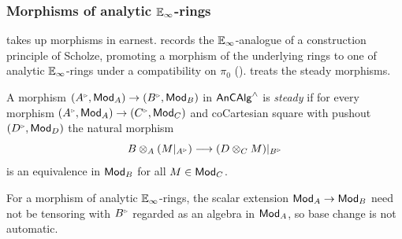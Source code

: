 \subsubsection{Morphisms of analytic \texorpdfstring{$\mathbb{E}_{\infty}$}{E-infinity}-rings}\label{subsubsec: intro morphisms}
 takes up morphisms in earnest.  records the $\mathbb{E}_{\infty}$-analogue of a construction principle of Scholze, promoting a morphism of the underlying rings to one of analytic $\mathbb{E}_{\infty}$-rings under a compatibility on $\pi_{0}$ ().  treats the steady morphisms.
\begin{definition*}[\ref{def: steady morphism}]
    A morphism $(A^{\tri},\Mod_{A})\to(B^{\tri},\Mod_{B})$ in $\mathsf{An}\mathsf{CAlg}^{\wedge}$ is \emph{steady} if for every morphism $(A^{\tri},\Mod_{A})\to(C^{\tri},\Mod_{C})$ and coCartesian square with pushout $(D^{\tri},\Mod_{D})$ the natural morphism
    $$B\otimes_{A}(M|_{A^{\tri}})\longrightarrow(D\otimes_{C}M)|_{B^{\tri}}$$
    is an equivalence in $\mathsf{Mod}_{B}$ for all $M\in\mathsf{Mod}_{C}$.
\end{definition*}
For a morphism of analytic $\mathbb{E}_{\infty}$-rings, the scalar extension $\mathsf{Mod}_{A}\to\mathsf{Mod}_{B}$ need not be tensoring with $B^{\tri}$ regarded as an algebra in $\mathsf{Mod}_{A}$, so base change is not automatic. 

